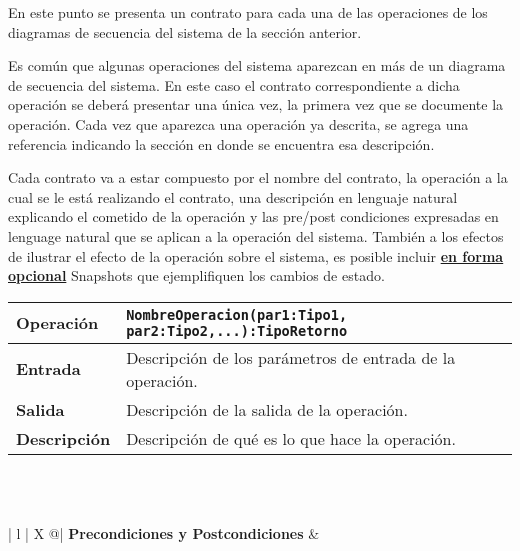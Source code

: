 \documentclass[10pt,spanish]{article}
\numberwithin{figure}{section} %
\begin{document}
\begin{siderules}
En este punto se presenta un contrato para cada una de las operaciones de los diagramas de secuencia del sistema de la sección anterior.

Es común que algunas operaciones del sistema aparezcan en más de un diagrama de secuencia del sistema. En este caso el contrato correspondiente a dicha operación se deberá presentar una única vez, la primera vez que se documente la operación. Cada vez que aparezca una operación ya descrita, se agrega una referencia indicando la sección en donde se encuentra esa descripción.

Cada contrato va a estar compuesto por el nombre del contrato, la operación a la cual se le está realizando el contrato, una descripción en lenguaje natural explicando el cometido de la operación y las pre/post condiciones expresadas en lenguage natural que se aplican a la operación del sistema. También a los efectos de ilustrar el efecto de la operación sobre el sistema, es posible incluir \textbf{\underline{en forma opcional}} Snapshots que ejemplifiquen los cambios de estado.\\

\begin{tabularx}{\textwidth}{| l | X @{}| } %
    \hline
    \textbf{Operación} & \verb|NombreOperacion(par1:Tipo1, par2:Tipo2,...):TipoRetorno| \\ \hline 
    \textbf{Entrada} & Descripción de los parámetros de entrada de la operación. \\ \hline
	\textbf{Salida} & Descripción de la salida de la operación. \\ \hline
    \textbf{Descripción} & Descripción de qué es lo que hace la operación. \\ \hline
\end{tabularx}\\ \\

\begin{tabularx}{\textwidth}{| l | X @{}| } %
    \textbf{Precondiciones y Postcondiciones} &  \\ \hline
     \\ \hline
    
    
\end{tabularx}

\end{siderules}
\end{document}
